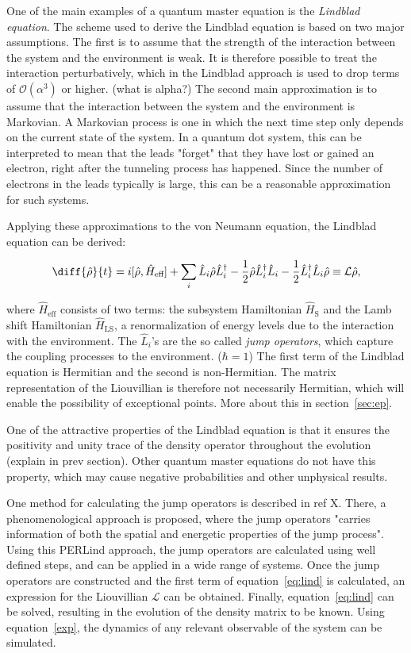 \documentclass[../main.tex]{subfiles}
\begin{document}
One of the main examples of a quantum master equation is the \textit{Lindblad equation}. The scheme used to derive the Lindblad equation is based on two major assumptions. The first is to assume that the strength of the interaction between the system and the environment is weak. It is therefore possible to treat the interaction perturbatively, which in the Lindblad approach is used to drop terms of $\mathcal{O}(\alpha^3)$ or higher. (what is alpha?) The second main approximation is to assume that the interaction between the system and the environment is Markovian. A Markovian process is one in which the next time step only depends on the current state of the system. In a quantum dot system, this can be interpreted to mean that the leads "forget" that they have lost or gained an electron, right after the tunneling process has happened. Since the number of electrons in the leads typically is large, this can be a reasonable approximation for such systems. 

Applying these approximations to the von Neumann equation, the Lindblad equation can be derived:

\begin{equation}\label{eq:lind}
    \diff{\hat\rho}{t} = i[\hat\rho, \hat H_\text{eff}] + \sum_i \hat L_i\hat\rho\hat L_i^\dag - \frac{1}{2}\hat\rho\hat L_i^\dag\hat L_i - \frac{1}{2}\hat L_i^\dag\hat L_i \hat\rho \equiv \mathcal{L}\hat\rho,
\end{equation}

where $\hat H_\text{eff}$ consists of two terms: the subsystem Hamiltonian $\hat H_\text{S}$ and the Lamb shift Hamiltonian $\hat H_\text{LS}$, a renormalization of energy levels due to the interaction with the environment. The $\hat L_i$'s are the so called \textit{jump operators}, which capture the coupling processes to the environment. ($\hbar=1$) The first term of the Lindblad equation is Hermitian and the second is non-Hermitian. The matrix representation of the Liouvillian is therefore not necessarily Hermitian, which will enable the possibility of exceptional points. More about this in section~\ref{sec:ep}.

One of the attractive properties of the Lindblad equation is that it ensures the positivity and unity trace of the density operator throughout the evolution (explain in prev section). Other quantum master equations do not have this property, which may cause negative probabilities and other unphysical results.

One method for calculating the jump operators is described in ref X. There, a phenomenological approach is proposed, where the jump operators "carries information of both the spatial and energetic properties of the jump process". Using this PERLind approach, the jump operators are calculated using well defined steps, and can be applied in a wide range of systems. Once the jump operators are constructed and the first term of equation~\eqref{eq:lind} is calculated, an expression for the Liouvillian $\mathcal{L}$ can be obtained. Finally, equation~\eqref{eq:lind} can be solved, resulting in the evolution of the density matrix to be known. Using equation~\eqref{exp}, the dynamics of any relevant observable of the system can be simulated.
\end{document}
